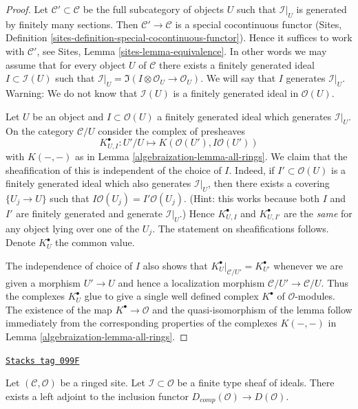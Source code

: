 \begin{proof}

Let $\mathcal{C}' \subset \mathcal{C}$ be the full subcategory
of objects $U$ such that $\mathcal{I}|_U$ is generated by
finitely many sections. Then $\mathcal{C}' \to \mathcal{C}$
is a special cocontinuous functor
(Sites, Definition \ref{sites-definition-special-cocontinuous-functor}).
Hence it suffices to work with $\mathcal{C}'$, see
Sites, Lemma \ref{sites-lemma-equivalence}.
In other words we may assume that for every
object $U$ of $\mathcal{C}$ there exists a finitely generated
ideal $I \subset \mathcal{I}(U)$ such that
$\mathcal{I}|_U = \Im(I \otimes \mathcal{O}_U \to \mathcal{O}_U)$.
We will say that $I$ generates $\mathcal{I}|_U$.
Warning: We do not know that $\mathcal{I}(U)$ is a finitely generated
ideal in $\mathcal{O}(U)$.

\medskip\noindent
Let $U$ be an object and $I \subset \mathcal{O}(U)$ a finitely
generated ideal which generates $\mathcal{I}|_U$.
On the category $\mathcal{C}/U$ consider the complex of presheaves
$$
K_{U, I}^\bullet : U'/U \longmapsto K(\mathcal{O}(U'), I\mathcal{O}(U'))
$$
with $K(-, -)$ as in Lemma \ref{algebraization-lemma-all-rings}.
We claim that the sheafification of this is independent of
the choice of $I$. Indeed, if $I' \subset \mathcal{O}(U)$
is a finitely generated ideal which also generates $\mathcal{I}|_U$, then
there exists a covering $\{U_j \to U\}$ such that
$I\mathcal{O}(U_j) = I'\mathcal{O}(U_j)$. (Hint: this works because
both $I$ and $I'$ are finitely generated and generate $\mathcal{I}|_U$.)
Hence $K_{U, I}^\bullet$ and $K_{U, I'}^\bullet$ are the {\it same}
for any object lying over one of the $U_j$. The statement
on sheafifications follows. Denote $K_U^\bullet$ the common value.

\medskip\noindent
The independence of choice of $I$ also shows that
$K_U^\bullet|_{\mathcal{C}/U'} = K_{U'}^\bullet$
whenever we are given a morphism
$U' \to U$ and hence a localization morphism
$\mathcal{C}/U' \to \mathcal{C}/U$. Thus the complexes
$K_U^\bullet$ glue to give a single well defined complex $K^\bullet$
of $\mathcal{O}$-modules. The existence of the map $K^\bullet \to \mathcal{O}$
and the quasi-isomorphism of the lemma follow immediately from
the corresponding properties of the complexes $K(-, -)$ in
Lemma \ref{algebraization-lemma-all-rings}.
\end{proof}

\begin{proposition}
\label{algebraization-proposition-derived-completion}
\href{https://stacks.math.columbia.edu/tag/099F}{\texttt{Stacks tag 099F}}

Let $(\mathcal{C}, \mathcal{O})$ be a ringed site.
Let $\mathcal{I} \subset \mathcal{O}$ be a finite type sheaf of
ideals. There exists a left adjoint to the inclusion
functor $D_{comp}(\mathcal{O}) \to D(\mathcal{O})$.
\end{proposition}

